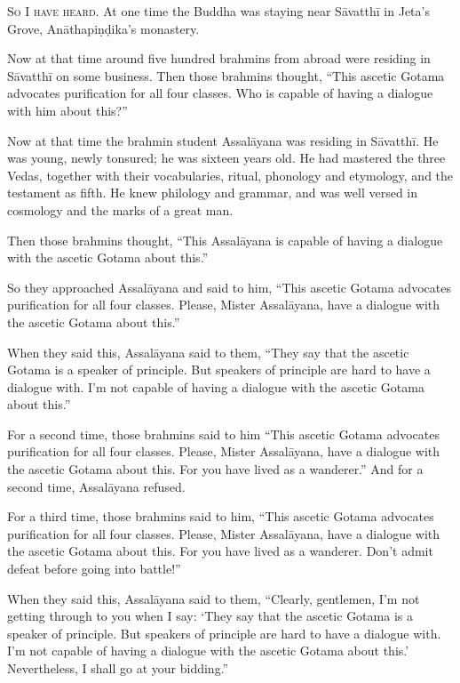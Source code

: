 \documentclass[12pt,openany]{book}%
\newcommand*{\scevam}[1]{\textsc{#1}}
\begin{document}
\scevam{So I have heard. }At one time the Buddha was staying near \textsanskrit{Sāvatthī} in Jeta’s Grove, \textsanskrit{Anāthapiṇḍika}’s monastery. 

Now at that time around five hundred brahmins from abroad were residing in \textsanskrit{Sāvatthī} on some business. Then those brahmins thought, “This ascetic Gotama advocates purification for all four classes. Who is capable of having a dialogue with him about this?” 

Now at that time the brahmin student \textsanskrit{Assalāyana} was residing in \textsanskrit{Sāvatthī}. He was young, newly tonsured; he was sixteen years old. He had mastered the three Vedas, together with their vocabularies, ritual, phonology and etymology, and the testament as fifth. He knew philology and grammar, and was well versed in cosmology and the marks of a great man. 

Then those brahmins thought, “This \textsanskrit{Assalāyana} is capable of having a dialogue with the ascetic Gotama about this.” 

So they approached \textsanskrit{Assalāyana} and said to him, “This ascetic Gotama advocates purification for all four classes. Please, Mister \textsanskrit{Assalāyana}, have a dialogue with the ascetic Gotama about this.” 

When they said this, \textsanskrit{Assalāyana} said to them, “They say that the ascetic Gotama is a speaker of principle. But speakers of principle are hard to have a dialogue with. I’m not capable of having a dialogue with the ascetic Gotama about this.” 

For a second time, those brahmins said to him “This ascetic Gotama advocates purification for all four classes. Please, Mister \textsanskrit{Assalāyana}, have a dialogue with the ascetic Gotama about this. For you have lived as a wanderer.” And for a second time, \textsanskrit{Assalāyana} refused. 

For a third time, those brahmins said to him, “This ascetic Gotama advocates purification for all four classes. Please, Mister \textsanskrit{Assalāyana}, have a dialogue with the ascetic Gotama about this. For you have lived as a wanderer. Don’t admit defeat before going into battle!” 

When they said this, \textsanskrit{Assalāyana} said to them, “Clearly, gentlemen, I’m not getting through to you when I say: ‘They say that the ascetic Gotama is a speaker of principle. But speakers of principle are hard to have a dialogue with. I’m not capable of having a dialogue with the ascetic Gotama about this.’ Nevertheless, I shall go at your bidding.” 
\end{document}

